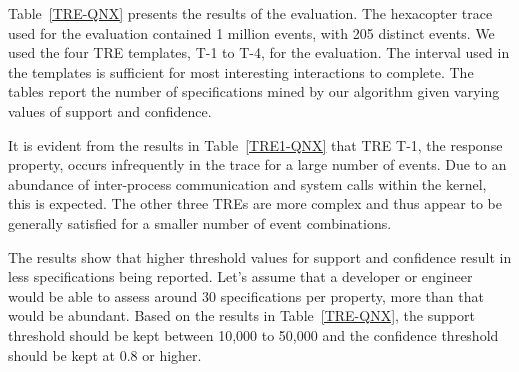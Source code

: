 \documentclass[]{sigplanconf}
\begin{document}
Table~\ref{TRE-QNX} presents the results of the evaluation. The hexacopter trace used for the evaluation contained 1 million events, with 205 distinct events. We used the four TRE templates, T-1 to T-4, for the evaluation. The interval used in the templates is sufficient for most interesting interactions to complete. The tables report the number of specifications mined by our algorithm given varying values of support and confidence.

It is evident from the results in Table~\ref{TRE1-QNX} that TRE T-1, the response property, occurs infrequently in the trace for a large number of events. Due to an abundance of inter-process communication and system calls within the kernel, this is expected. The other three TREs are more complex and thus appear to be generally satisfied for a smaller number of event combinations.

The results show that higher threshold values for support and confidence result in less specifications being reported. Let's assume that a developer or engineer would be able to assess around 30 specifications per property, more than that would be abundant. Based on the results in Table~\ref{TRE-QNX}, the support threshold should be kept between 10,000 to 50,000 and the confidence threshold should be kept at 0.8 or higher.
\end{document}
